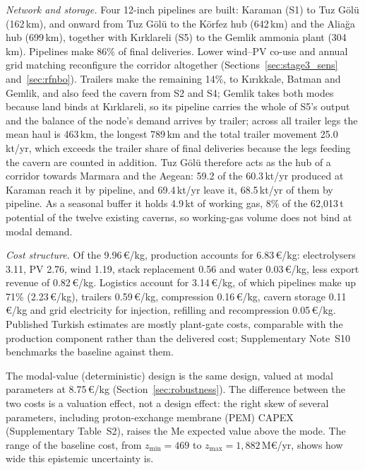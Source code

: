 \documentclass[preprint,12pt,authoryear]{elsarticle}
\begin{document}
\textit{Network and storage.} Four 12-inch pipelines are built: Karaman (S1) to Tuz Gölü (162\,km), and onward from Tuz Gölü to the Körfez hub (642\,km) and the Aliağa hub (699\,km), together with Kırklareli (S5) to the Gemlik ammonia plant (304\,km). Pipelines make 86\% of final deliveries. Lower wind--PV co-use and annual grid matching reconfigure the corridor altogether (Sections~\ref{sec:stage3_sens} and~\ref{sec:rfnbo}). Trailers make the remaining 14\%, to Kırıkkale, Batman and Gemlik, and also feed the cavern from S2 and S4; Gemlik takes both modes because land binds at Kırklareli, so its pipeline carries the whole of S5's output and the balance of the node's demand arrives by trailer; across all trailer legs the mean haul is 463\,km, the longest 789\,km and the total trailer movement 25.0\,kt/yr, which exceeds the trailer share of final deliveries because the legs feeding the cavern are counted in addition. Tuz Gölü therefore acts as the hub of a corridor towards Marmara and the Aegean: 59.2 of the 60.3\,kt/yr produced at Karaman reach it by pipeline, and 69.4\,kt/yr leave it, 68.5\,kt/yr of them by pipeline. As a seasonal buffer it holds 4.9\,kt of working gas, 8\% of the 62,013\,t potential of the twelve existing caverns, so working-gas volume does not bind at modal demand.

\textit{Cost structure.} Of the 9.96\,€/kg, production accounts for 6.83\,€/kg: electrolysers 3.11, PV 2.76, wind 1.19, stack replacement 0.56 and water 0.03\,€/kg, less export revenue of 0.82\,€/kg. Logistics account for 3.14\,€/kg, of which pipelines make up 71\% (2.23\,€/kg), trailers 0.59\,€/kg, compression 0.16\,€/kg, cavern storage 0.11\,€/kg and grid electricity for injection, refilling and recompression 0.05\,€/kg. Published Turkish estimates are mostly plant-gate costs, comparable with the production component rather than the delivered cost; Supplementary Note~S10 benchmarks the baseline against them.

The modal-value (deterministic) design is the same design, valued at modal parameters at 8.75\,€/kg (Section~\ref{sec:robustness}). The difference between the two costs is a valuation effect, not a design effect: the right skew of several parameters, including proton-exchange membrane (PEM) CAPEX (Supplementary Table~S2), raises the Me expected value above the mode. The range of the baseline cost, from $z_{\min} = 469$ to $z_{\max} = 1{,}882$\,M€/yr, shows how wide this epistemic uncertainty is.
\end{document}
